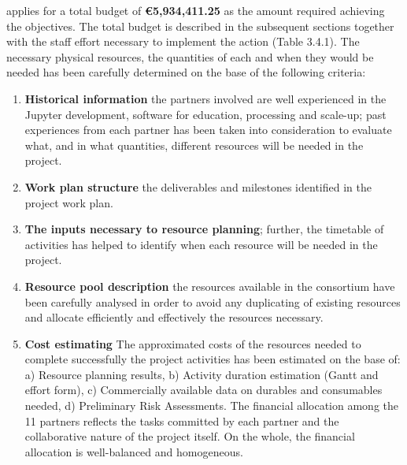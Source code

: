 %
%
\TheProject applies for a total budget of \textbf{\euro 5,934,411.25} as the amount
required achieving the objectives. The total budget is described in the subsequent
sections together with the staff effort necessary to implement the action (Table 3.4.1).
The necessary physical resources, the quantities of each and when they would be
needed has been carefully determined on the base of the following criteria:

\begin{enumerate}

\item \textbf{Historical information} the partners involved are well experienced in the
Jupyter development, software for education, processing and scale-up; past experiences
from each partner has been taken into consideration to evaluate what, and in what
quantities, different resources will be needed in the project.
\item \textbf{Work plan structure} the deliverables and milestones identified in the project work plan.
\item \textbf{The inputs necessary to resource planning}; further, the timetable of activities has helped to identify when each resource will be needed in the project.
\item \textbf{Resource pool description} the resources available in the consortium have
been carefully analysed in order to avoid any duplicating of existing resources
and allocate efficiently and effectively the resources necessary.
\item \textbf{Cost estimating}  The approximated costs of the resources needed to
complete successfully the project activities has been estimated on the base
of: a) Resource planning results, b) Activity duration estimation (Gantt and effort form),
c) Commercially available data on durables and consumables needed,
d) Preliminary Risk Assessments.
The financial allocation among the 11 partners reflects the tasks committed by each partner
and the collaborative nature of the project itself. On the whole, the financial allocation is
well-balanced and homogeneous.
\end{enumerate}

